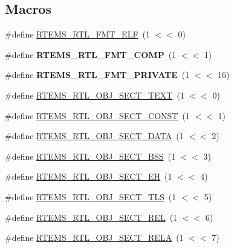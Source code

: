 \subsection*{Macros}
\begin{DoxyCompactItemize}
\item 
\#define \mbox{\hyperlink{rtl-obj_8h_a6953d174aa285c36ca012a802cb849e5}{R\+T\+E\+M\+S\+\_\+\+R\+T\+L\+\_\+\+F\+M\+T\+\_\+\+E\+LF}}~(1 $<$$<$ 0)
\item 
\mbox{\label{rtl-obj_8h_a016008ad369ab440dde1e105994eb85b}} 
\#define {\bfseries R\+T\+E\+M\+S\+\_\+\+R\+T\+L\+\_\+\+F\+M\+T\+\_\+\+C\+O\+MP}~(1 $<$$<$ 1)
\item 
\mbox{\label{rtl-obj_8h_abd4f890b51ad353ba8f65d3386d91c56}} 
\#define {\bfseries R\+T\+E\+M\+S\+\_\+\+R\+T\+L\+\_\+\+F\+M\+T\+\_\+\+P\+R\+I\+V\+A\+TE}~(1 $<$$<$ 16)
\item 
\#define \mbox{\hyperlink{rtl-obj_8h_a8c7ce3fe6f7ab4227f3965e47971bb6b}{R\+T\+E\+M\+S\+\_\+\+R\+T\+L\+\_\+\+O\+B\+J\+\_\+\+S\+E\+C\+T\+\_\+\+T\+E\+XT}}~(1 $<$$<$ 0)
\item 
\#define \mbox{\hyperlink{rtl-obj_8h_a842e2f3300a5c2b0333a7ad042750b07}{R\+T\+E\+M\+S\+\_\+\+R\+T\+L\+\_\+\+O\+B\+J\+\_\+\+S\+E\+C\+T\+\_\+\+C\+O\+N\+ST}}~(1 $<$$<$ 1)
\item 
\#define \mbox{\hyperlink{rtl-obj_8h_abb0d292466963269546551a2fd4bba31}{R\+T\+E\+M\+S\+\_\+\+R\+T\+L\+\_\+\+O\+B\+J\+\_\+\+S\+E\+C\+T\+\_\+\+D\+A\+TA}}~(1 $<$$<$ 2)
\item 
\#define \mbox{\hyperlink{rtl-obj_8h_af1483165c89bdbba44cfe0d93bf4b4f9}{R\+T\+E\+M\+S\+\_\+\+R\+T\+L\+\_\+\+O\+B\+J\+\_\+\+S\+E\+C\+T\+\_\+\+B\+SS}}~(1 $<$$<$ 3)
\item 
\#define \mbox{\hyperlink{rtl-obj_8h_a481dc5a8ba6a539f86d0e7577d6554a1}{R\+T\+E\+M\+S\+\_\+\+R\+T\+L\+\_\+\+O\+B\+J\+\_\+\+S\+E\+C\+T\+\_\+\+EH}}~(1 $<$$<$ 4)
\item 
\#define \mbox{\hyperlink{rtl-obj_8h_a5b5ed964c3abe1fe49d8e4a54e626e55}{R\+T\+E\+M\+S\+\_\+\+R\+T\+L\+\_\+\+O\+B\+J\+\_\+\+S\+E\+C\+T\+\_\+\+T\+LS}}~(1 $<$$<$ 5)
\item 
\#define \mbox{\hyperlink{rtl-obj_8h_a972b33963579cd03ea4891b8fc271f38}{R\+T\+E\+M\+S\+\_\+\+R\+T\+L\+\_\+\+O\+B\+J\+\_\+\+S\+E\+C\+T\+\_\+\+R\+EL}}~(1 $<$$<$ 6)
\item 
\#define \mbox{\hyperlink{rtl-obj_8h_a6cdb7527bfb9efe6fcc30593c57b99d7}{R\+T\+E\+M\+S\+\_\+\+R\+T\+L\+\_\+\+O\+B\+J\+\_\+\+S\+E\+C\+T\+\_\+\+R\+E\+LA}}~(1 $<$$<$ 7)
$$
\end{DoxyCompactItemize}
